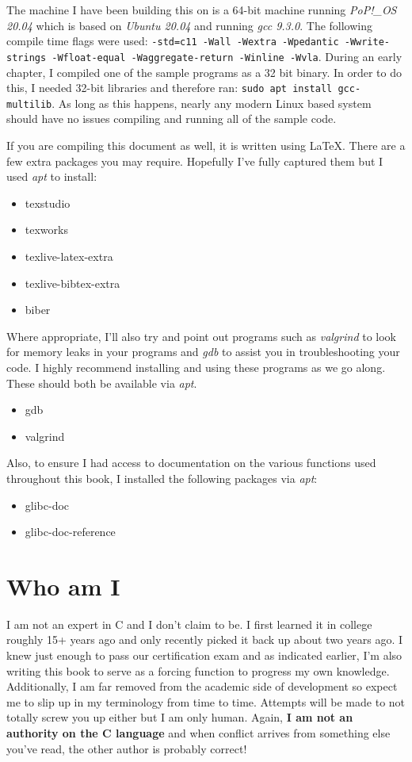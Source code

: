 \documentclass[../main.tex]{subfiles}
\begin{document}
The machine I have been building this on is a 64-bit machine running \emph{PoP!\_OS 20.04} which is based on \emph{Ubuntu 20.04} and running \emph{gcc 9.3.0}. The following compile time flags were used: \texttt{-std=c11 -Wall -Wextra -Wpedantic -Wwrite-strings -Wfloat-equal -Waggregate-return -Winline -Wvla}. During an early chapter, I compiled one of the sample programs as a 32 bit binary.  In order to do this, I needed 32-bit libraries and therefore ran: \texttt{sudo apt install gcc-multilib}.  As long as this happens, nearly any modern Linux based system should have no issues compiling and running all of the sample code.  

If you are compiling this document as well, it is written using \LaTeX.  There are a few extra packages you may require.  Hopefully I've fully captured them but I used \textit{apt} to install:
\begin{itemize}
	\item texstudio
	\item texworks
	\item texlive-latex-extra
	\item texlive-bibtex-extra
	\item biber
\end{itemize}

Where appropriate, I'll also try and point out programs such as \textit{valgrind} to look for memory leaks in your programs and \textit{gdb} to assist you in troubleshooting your code. I highly recommend installing and using these programs as we go along.  These should both be available via \textit{apt}.
\begin{itemize}
	\item gdb
	\item valgrind
\end{itemize}

Also, to ensure I had access to documentation on the various functions used throughout this book, I installed the following packages via \textit{apt}:
\begin{itemize}
	\item glibc-doc
	\item glibc-doc-reference
\end{itemize}

\section{Who am I}
I am not an expert in C and I don't claim to be.  I first learned it in college roughly 15+ years ago and only recently picked it back up about two years ago.  I knew just enough to pass our certification exam and as indicated earlier, I'm also writing this book to serve as a forcing function to progress my own knowledge.  Additionally, I am far removed from the academic side of development so expect me to slip up in my terminology from time to time.  Attempts will be made to not totally screw you up either but I am only human.  Again, \textbf{I am not an authority on the C language} and when conflict arrives from something else you've read, the other author is probably correct!
\end{document}
